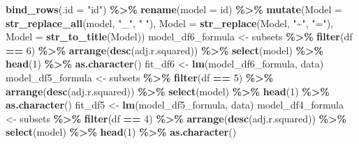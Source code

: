 \documentclass[
  english,
  man,floatsintext]{apa6}
\newenvironment{Shaded}{\begin{snugshade}}{\end{snugshade}}
\newcommand{\DataTypeTok}[1]{\textcolor[rgb]{0.13,0.29,0.53}{#1}}
\newcommand{\DecValTok}[1]{\textcolor[rgb]{0.00,0.00,0.81}{#1}}
\newcommand{\KeywordTok}[1]{\textcolor[rgb]{0.13,0.29,0.53}{\textbf{#1}}}
\newcommand{\NormalTok}[1]{#1}
\newcommand{\OperatorTok}[1]{\textcolor[rgb]{0.81,0.36,0.00}{\textbf{#1}}}
\newcommand{\StringTok}[1]{\textcolor[rgb]{0.31,0.60,0.02}{#1}}
\begin{document}
\begin{Shaded}
\begin{Highlighting}[]
\StringTok{  }\KeywordTok{bind\_rows}\NormalTok{(}\DataTypeTok{.id =} \StringTok{"id"}\NormalTok{) }\OperatorTok{\%\textgreater{}\%}\StringTok{ }
\StringTok{  }\KeywordTok{rename}\NormalTok{(}\DataTypeTok{model =}\NormalTok{ id) }\OperatorTok{\%\textgreater{}\%}\StringTok{ }
\StringTok{  }\KeywordTok{mutate}\NormalTok{(}\DataTypeTok{Model =} \KeywordTok{str\_replace\_all}\NormalTok{(model, }\StringTok{"\_"}\NormalTok{, }\StringTok{" "}\NormalTok{),}
         \DataTypeTok{Model =} \KeywordTok{str\_replace}\NormalTok{(Model, }\StringTok{"\textasciitilde{}"}\NormalTok{, }\StringTok{"="}\NormalTok{), }
         \DataTypeTok{Model =} \KeywordTok{str\_to\_title}\NormalTok{(Model))}
\NormalTok{model\_df6\_formula \textless{}{-}}\StringTok{ }\NormalTok{subsets }\OperatorTok{\%\textgreater{}\%}\StringTok{ }\KeywordTok{filter}\NormalTok{(df }\OperatorTok{==}\StringTok{ }\DecValTok{6}\NormalTok{) }\OperatorTok{\%\textgreater{}\%}\StringTok{ }
\StringTok{  }\KeywordTok{arrange}\NormalTok{(}\KeywordTok{desc}\NormalTok{(adj.r.squared)) }\OperatorTok{\%\textgreater{}\%}\StringTok{ }
\StringTok{  }\KeywordTok{select}\NormalTok{(model) }\OperatorTok{\%\textgreater{}\%}\StringTok{ }\KeywordTok{head}\NormalTok{(}\DecValTok{1}\NormalTok{) }\OperatorTok{\%\textgreater{}\%}\StringTok{ }\KeywordTok{as.character}\NormalTok{() }
\NormalTok{fit\_df6 \textless{}{-}}\StringTok{ }\KeywordTok{lm}\NormalTok{(model\_df6\_formula, data)}
\NormalTok{model\_df5\_formula \textless{}{-}}\StringTok{ }\NormalTok{subsets }\OperatorTok{\%\textgreater{}\%}\StringTok{ }\KeywordTok{filter}\NormalTok{(df }\OperatorTok{==}\StringTok{ }\DecValTok{5}\NormalTok{) }\OperatorTok{\%\textgreater{}\%}\StringTok{ }
\StringTok{  }\KeywordTok{arrange}\NormalTok{(}\KeywordTok{desc}\NormalTok{(adj.r.squared)) }\OperatorTok{\%\textgreater{}\%}\StringTok{ }
\StringTok{  }\KeywordTok{select}\NormalTok{(model) }\OperatorTok{\%\textgreater{}\%}\StringTok{ }\KeywordTok{head}\NormalTok{(}\DecValTok{1}\NormalTok{) }\OperatorTok{\%\textgreater{}\%}\StringTok{ }\KeywordTok{as.character}\NormalTok{()}
\NormalTok{fit\_df5 \textless{}{-}}\StringTok{ }\KeywordTok{lm}\NormalTok{(model\_df5\_formula, data)}
\NormalTok{model\_df4\_formula \textless{}{-}}\StringTok{ }\NormalTok{subsets }\OperatorTok{\%\textgreater{}\%}\StringTok{ }\KeywordTok{filter}\NormalTok{(df }\OperatorTok{==}\StringTok{ }\DecValTok{4}\NormalTok{) }\OperatorTok{\%\textgreater{}\%}\StringTok{ }
\StringTok{  }\KeywordTok{arrange}\NormalTok{(}\KeywordTok{desc}\NormalTok{(adj.r.squared)) }\OperatorTok{\%\textgreater{}\%}\StringTok{ }
\StringTok{  }\KeywordTok{select}\NormalTok{(model) }\OperatorTok{\%\textgreater{}\%}\StringTok{ }\KeywordTok{head}\NormalTok{(}\DecValTok{1}\NormalTok{) }\OperatorTok{\%\textgreater{}\%}\StringTok{ }\KeywordTok{as.character}\NormalTok{() }

\end{Highlighting}
\end{Shaded}
\end{document}
